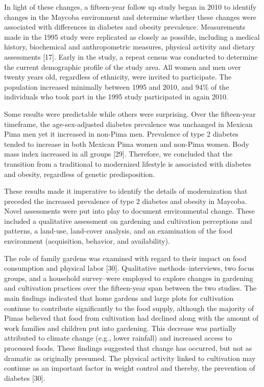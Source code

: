 \documentclass[12pt]{article}
\begin{document}
In light of these changes, a fifteen-year follow up study began in 2010 to identify changes in the Maycoba environment and determine whether these changes were associated with differences in diabetes and obesity prevalence. Measurements made in the 1995 study were replicated as closely as possible, including a medical history, biochemical and anthropometric measures, physical activity and dietary assessments [17]. Early in the study, a repeat census was conducted to determine the current demographic profile of the study area. All women and men over twenty years old, regardless of ethnicity, were invited to participate. The population increased minimally between 1995 and 2010, and 94\% of the individuals who took part in the 1995 study participated in again 2010.

Some results were predictable while others were surprising. Over the fifteen-year timeframe, the age-sex-adjusted diabetes prevalence was unchanged in Mexican Pima men yet it increased in non-Pima men. Prevalence of type 2 diabetes tended to increase in both Mexican Pima women and non-Pima women. Body mass index increased in all groups [29]. Therefore, we concluded that the transition from a traditional to modernized lifestyle is associated with diabetes and obesity, regardless of genetic predisposition.

These results made it imperative to identify the details of modernization that preceded the increased prevalence of type 2 diabetes and obesity in Maycoba. Novel assessments were put into play to document environmental change. These included a qualitative assessment on gardening and cultivation perceptions and patterns, a land-use, land-cover analysis, and an examination of the food environment (acquisition, behavior, and availability).

The role of family gardens was examined with regard to their impact on food consumption and physical labor [30]. Qualitative methods--interviews, two focus groups, and a household survey--were employed to explore changes in gardening and cultivation practices over the fifteen-year span between the two studies. The main findings indicated that home gardens and large plots for cultivation continue to contribute significantly to the food supply, although the majority of Pimas believed that food from cultivation had declined along with the amount of work families and children put into gardening. This decrease was partially attributed to climate change (e.g., lower rainfall) and increased access to processed foods. These findings suggested that change has occurred, but not as dramatic as originally presumed. The physical activity linked to cultivation may continue as an important factor in weight control and thereby, the prevention of diabetes [30].
\end{document}
